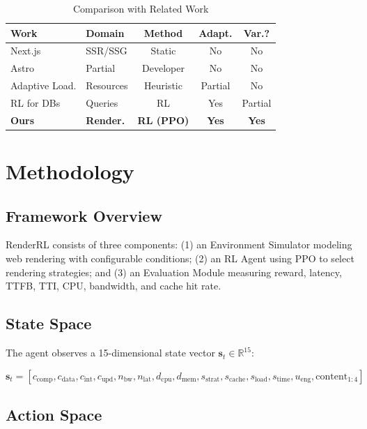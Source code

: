 \documentclass[10pt,twocolumn]{article}
\newcommand{\method}{RenderRL}
\newcommand{\reals}{\mathbb{R}}
\begin{document}
\begin{table}[t]
\centering
\caption{Comparison with Related Work}
\label{tab:related}
\small
\begin{tabular}{llccc}
\toprule
\textbf{Work} & \textbf{Domain} & \textbf{Method} & \textbf{Adapt.} & \textbf{Var.?} \\
\midrule
Next.js & SSR/SSG & Static & No & No \\
Astro & Partial & Developer & No & No \\
Adaptive Load. & Resources & Heuristic & Partial & No \\
RL for DBs & Queries & RL & Yes & Partial \\
\textbf{Ours} & \textbf{Render.} & \textbf{RL (PPO)} & \textbf{Yes} & \textbf{Yes} \\
\bottomrule
\end{tabular}
\end{table}

\section{Methodology}
\label{sec:methodology}

\subsection{Framework Overview}

\method{} consists of three components: (1) an Environment Simulator modeling web rendering with configurable conditions; (2) an RL Agent using PPO to select rendering strategies; and (3) an Evaluation Module measuring reward, latency, TTFB, TTI, CPU, bandwidth, and cache hit rate.

\subsection{State Space}

The agent observes a 15-dimensional state vector $\mathbf{s}_t \in \reals^{15}$:

\begin{equation}
\mathbf{s}_t = [c_{\text{comp}}, c_{\text{data}}, c_{\text{int}}, c_{\text{upd}}, n_{\text{bw}}, n_{\text{lat}}, d_{\text{cpu}}, d_{\text{mem}}, s_{\text{strat}}, s_{\text{cache}}, s_{\text{load}}, s_{\text{time}}, u_{\text{eng}}, \text{content}_{1:4}]
\end{equation}

\subsection{Action Space}
\end{document}
